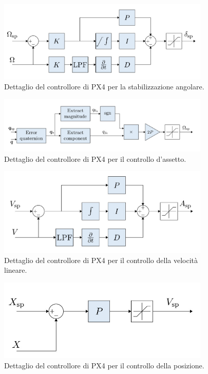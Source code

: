\begin{figure}
    \centering
    \includegraphics[width=0.9\textwidth]{figs/chapter3/px4-angularcont.jpg}
    \caption{Dettaglio del controllore di PX4 per la stabilizzazione angolare.}
    \label{fig:px4angular}
\end{figure}

\begin{figure}
    \centering
    \includegraphics[width=0.9\textwidth]{figs/chapter3/px4-attitude.jpg}
    \caption{Dettaglio del controllore di PX4 per il controllo d'assetto.}
    \label{fig:px4attitude}
\end{figure}

\begin{figure}
    \centering
    \includegraphics[width=0.9\textwidth]{figs/chapter3/px4-velocity.jpg}
    \caption{Dettaglio del controllore di PX4 per il controllo della velocità lineare.}
    \label{fig:px4velocity}
\end{figure}

\begin{figure}
    \centering
    \includegraphics[width=0.9\textwidth]{figs/chapter3/px4-position.jpg}
    \caption{Dettaglio del controllore di PX4 per il controllo della posizione.}
    \label{fig:px4position}
\end{figure}

